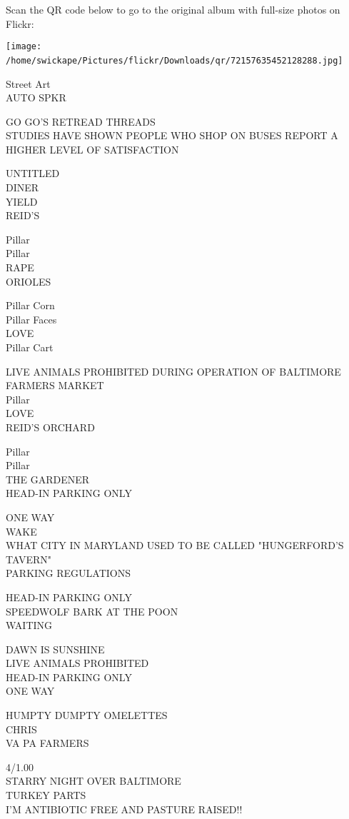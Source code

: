 \documentclass[10pt,letterpaper]{article}
\begin{document}
Scan the QR code below to go to the original album with full-size photos on Flickr:

\texttt{[image: /home/swickape/Pictures/flickr/Downloads/qr/72157635452128288.jpg]}
\

Street Art\\
AUTO SPKR

GO GO'S RETREAD THREADS\\
STUDIES HAVE SHOWN PEOPLE WHO SHOP ON BUSES REPORT A HIGHER LEVEL OF SATISFACTION

UNTITLED\\
DINER\\
YIELD\\
REID'S

Pillar\\
Pillar\\
RAPE\\
ORIOLES

Pillar Corn\\
Pillar Faces\\
LOVE\\
Pillar Cart

LIVE ANIMALS PROHIBITED DURING OPERATION OF BALTIMORE FARMERS MARKET\\
Pillar\\
LOVE\\
REID'S ORCHARD

Pillar\\
Pillar\\
THE GARDENER\\
HEAD{-}IN PARKING ONLY

ONE WAY\\
WAKE\\
WHAT CITY IN MARYLAND USED TO BE CALLED "HUNGERFORD'S TAVERN"\\
PARKING REGULATIONS

HEAD{-}IN PARKING ONLY\\
SPEEDWOLF BARK AT THE POON\\
WAITING

DAWN IS SUNSHINE\\
LIVE ANIMALS PROHIBITED\\
HEAD{-}IN PARKING ONLY\\
ONE WAY

HUMPTY DUMPTY OMELETTES\\
CHRIS\\
VA PA FARMERS

4/1.00\\
STARRY NIGHT OVER BALTIMORE\\
TURKEY PARTS\\
I'M ANTIBIOTIC FREE AND PASTURE RAISED!!
\end{document}
